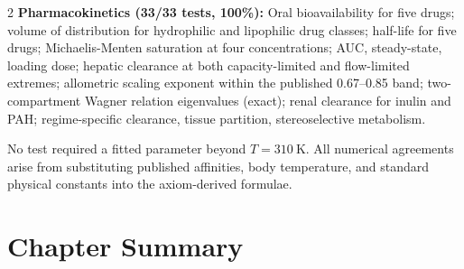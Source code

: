 \begin{multicols}{2}
\textbf{Pharmacokinetics (33/33 tests, 100\%):} Oral bioavailability for five drugs; volume of distribution for hydrophilic and lipophilic drug classes; half-life for five drugs; Michaelis-Menten saturation at four concentrations; AUC, steady-state, loading dose; hepatic clearance at both capacity-limited and flow-limited extremes; allometric scaling exponent within the published 0.67--0.85 band; two-compartment Wagner relation eigenvalues (exact); renal clearance for inulin and PAH; regime-specific clearance, tissue partition, stereoselective metabolism.

No test required a fitted parameter beyond $T = 310\ \mathrm{K}$. All numerical agreements arise from substituting published affinities, body temperature, and standard physical constants into the axiom-derived formulae.

\end{multicols}

\section{Chapter Summary}
\label{sec:ch12_summary}

